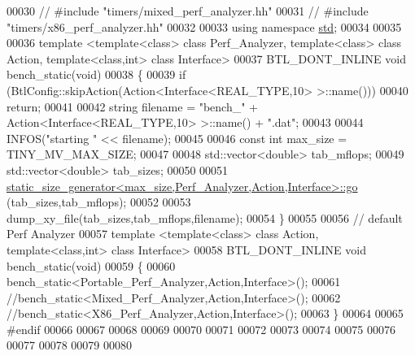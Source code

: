 \begin{DoxyCode}
00030 \textcolor{comment}{// #include "timers/mixed\_perf\_analyzer.hh"}
00031 \textcolor{comment}{// #include "timers/x86\_perf\_analyzer.hh"}
00032 
00033 \textcolor{keyword}{using namespace }\hyperlink{namespacestd}{std};
00034 
00035 
00036 \textcolor{keyword}{template} <\textcolor{keyword}{template}<\textcolor{keyword}{class}> \textcolor{keyword}{class }Perf\_Analyzer, \textcolor{keyword}{template}<\textcolor{keyword}{class}> \textcolor{keyword}{class }Action, \textcolor{keyword}{template}<\textcolor{keyword}{class},\textcolor{keywordtype}{int}> \textcolor{keyword}{class }
      Interface>
00037 BTL\_DONT\_INLINE  \textcolor{keywordtype}{void} bench\_static(\textcolor{keywordtype}{void})
00038 \{
00039   \textcolor{keywordflow}{if} (BtlConfig::skipAction(Action<Interface<REAL\_TYPE,10> >::name()))
00040     \textcolor{keywordflow}{return};
00041 
00042   \textcolor{keywordtype}{string} filename = \textcolor{stringliteral}{"bench\_"} + Action<Interface<REAL\_TYPE,10> >::name() + \textcolor{stringliteral}{".dat"};
00043 
00044   INFOS(\textcolor{stringliteral}{"starting "} << filename);
00045 
00046   \textcolor{keyword}{const} \textcolor{keywordtype}{int} max\_size = TINY\_MV\_MAX\_SIZE;
00047 
00048   std::vector<double> tab\_mflops;
00049   std::vector<double> tab\_sizes;
00050 
00051   \hyperlink{structstatic__size__generator}{static\_size\_generator<max\_size,Perf\_Analyzer,Action,Interface>::go}
      (tab\_sizes,tab\_mflops);
00052 
00053   dump\_xy\_file(tab\_sizes,tab\_mflops,filename);
00054 \}
00055 
00056 \textcolor{comment}{// default Perf Analyzer}
00057 \textcolor{keyword}{template} <\textcolor{keyword}{template}<\textcolor{keyword}{class}> \textcolor{keyword}{class }Action, \textcolor{keyword}{template}<\textcolor{keyword}{class},\textcolor{keywordtype}{int}> \textcolor{keyword}{class }Interface>
00058 BTL\_DONT\_INLINE  \textcolor{keywordtype}{void} bench\_static(\textcolor{keywordtype}{void})
00059 \{
00060   bench\_static<Portable\_Perf\_Analyzer,Action,Interface>();
00061   \textcolor{comment}{//bench\_static<Mixed\_Perf\_Analyzer,Action,Interface>();}
00062   \textcolor{comment}{//bench\_static<X86\_Perf\_Analyzer,Action,Interface>();}
00063 \}
00064 
00065 \textcolor{preprocessor}{#endif}
00066 
00067 
00068 
00069 
00070 
00071 
00072 
00073 
00074 
00075 
00076 
00077 
00078 
00079 
00080 
\end{DoxyCode}
